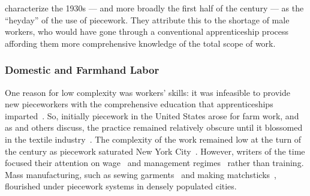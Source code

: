 \documentclass[trackingWork]{subfiles}
\begin{document}

\citeauthor{hart2013rise} characterize the 1930s
--- and more broadly the first half of the  century ---
as the ``heyday'' of the use of piecework.
They attribute this to the shortage of male workers,
who would have gone through a conventional apprenticeship process
affording them more comprehensive knowledge of the total scope of work.





\subsubsection{Domestic and Farmhand Labor}
One reason for low complexity was workers' skills:
it was infeasible to provide new pieceworkers with the comprehensive education
that apprenticeships imparted~\cite{hart2013rise}.
So, initially piecework in the United States arose for farm work, and as
\citeauthor{hughRaynbirdTaskWork} and others discuss,
the practice remained relatively obscure until
it blossomed in the textile industry~\cite{hughRaynbirdTaskWork}.
The complexity of the work remained low at the turn of
the  century as piecework saturated New York City~\cite{riisOtherSideLives}.
However, writers of the time focused their attention on
wage~\cite{burton1899commercial} and
management regimes~\cite{norton1900textile}
rather than training.
Mass manufacturing,
such as sewing garments~\cite{riisOtherSideLives} and making matchsticks~\cite{10.2307/3827491},
flourished under piecework systems in densely populated cities.
\end{document}
